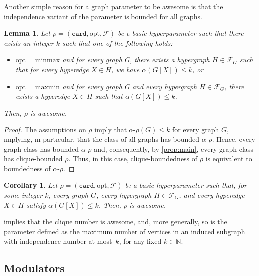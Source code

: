 \documentclass[11pt]{article}
\newcommand{\opt}{\mathrm{opt}}
\theoremstyle{plain}
\newtheorem{lemma}[theorem]{Lemma}
\newtheorem{corollary}[theorem]{Corollary}
\theoremstyle{definition}
\theoremstyle{remark}
\numberwithin{equation}{section}
\begin{document}
Another simple reason for a graph parameter to be awesome is that the independence variant of the parameter is bounded for all graphs.

\begin{lemma}\label{lem:bounded-alpha-properties}
Let $\rho = (\mathtt{card}, \opt, \mathcal{F})$ be a basic hyperparameter such that there exists an integer $k$ such that one of the following holds:
\begin{itemize}
    \item $\mathrm{opt}= \mathrm{minmax}$ and for every graph $G$, there exists a hypergraph $H\in \mathcal{F}_G$ such that for every hyperedge $X\in H$, we have $\alpha(G[X])\le k$, or
    \item $\mathrm{opt}= \mathrm{maxmin}$ and for every graph $G$ and every hypergraph $H\in \mathcal{F}_G$, there exists a hyperedge $X\in H$ such that $\alpha(G[X])\le k$.    
\end{itemize}
Then, $\rho$ is awesome.
\end{lemma}

\begin{proof}
The assumptions on $\rho$ imply that $\alpha\text{-}\rho(G)\le k$ for every graph $G$, implying, in particular, that the class of all graphs has bounded $\alpha\text{-}\rho$.
Hence, every graph class has bounded $\alpha\text{-}\rho$ and, consequently, by \cref{prop:main}, every graph class has clique-bounded $\rho$.
Thus, in this case, clique-boundedness of $\rho$ is equivalent to boundedness of $\alpha\text{-}\rho$.
\end{proof}

\begin{corollary}\label{cor:bounded-alpha-properties}
Let $\rho = (\mathtt{card}, \opt, \mathcal{F})$ be a basic hyperparameter such that, for some integer $k$, every graph $G$, every hypergraph $H\in \mathcal{F}_G$, and every hyperedge $X\in H$ satisfy $\alpha(G[X])\le k$.
Then, $\rho$ is awesome.
\end{corollary}

 implies that the clique number is awesome, and, more generally, so is the parameter defined as the maximum number of vertices in an induced subgraph with independence number at most~$k$, for any fixed $k\in \mathbb{N}$.

\begin{sloppypar}
\subsection{Modulators}
\end{sloppypar}
\end{document}
